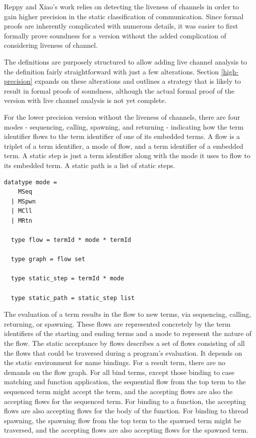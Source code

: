 \documentclass[letterpaper, 11pt]{extarticle}
\begin{document}
Reppy and Xiao's work relies on detecting the liveness of channels in order to gain higher
precision in the static classification of communication. Since formal proofs are inherently
complicated with numerous details, it was easier to first formally prove soundness for a
version without the added complication of considering liveness of channel.

The definitions are purposely structured to allow adding live channel analysis to the
definition fairly straightforward with just a few alterations. Section \ref{high-precision} expands on
these alterations and outlines a strategy that is likely to result in formal proofs of
soundness, although the actual formal proof of the version with live channel analysis is
not yet complete. 

For the lower precision version without the liveness of channels, there are four modes -
sequencing, calling, spawning, and returning -
indicating how the term identifier flows to the term identifier of one of its embedded terms.
A flow is a triplet of a term identifier, a mode of flow, and a term identifier of a
embedded term. A static step is just a term identifier along with the mode it uses to
flow to its embedded term. A static path is a list of static steps. 

\begin{lstlisting}[language=logic, mathescape]
  datatype mode =
    MSeq
  | MSpwn
  | MCll
  | MRtn

  type flow = termId * mode * termId

  type graph = flow set

  type static_step = termId * mode

  type static_path = static_step list
\end{lstlisting}

The evaluation of a term results in the flow to new terms,
via sequencing, calling, returning, or spawning. These flows are represented concretely
by the term identifiers of the starting and ending terms and a mode
to represent the nature of the flow.
The static acceptance by flows describes a set of flows consisting of all the flows
that could be traversed during a program's evaluation.
It depends on the static environment for name bindings.
For a result term, there are no demands on the flow graph. For all bind terms, except those binding
to case matching and function application, the sequential flow from the top term to
the sequenced term might accept the term, and the accepting flows are also the
accepting flows for the sequenced term. For binding to a function, the
accepting flows are also accepting flows for the body of the function.
For binding to thread spawning, the spawning flow from the top term
to the spawned term might be traversed, and the accepting flows are also
accepting flows for the spawned term.
\end{document}
